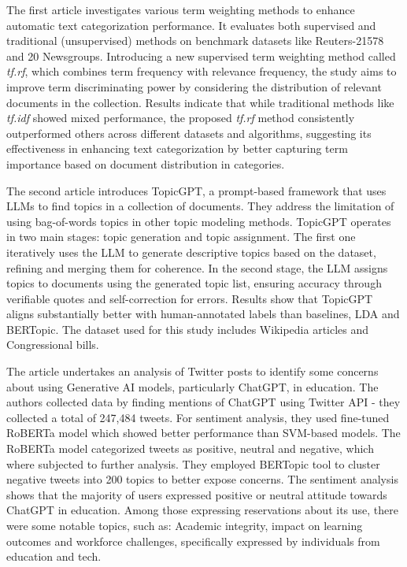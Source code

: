 \documentclass[fleqn,moreauthors,10pt]{ds_report}
\begin{document}
The first article \cite{4509437} investigates various term weighting methods to enhance automatic text categorization performance. It evaluates both supervised and traditional (unsupervised) methods on benchmark datasets like Reuters-21578 and 20 Newsgroups. Introducing a new supervised term weighting method called \textit{tf.rf}, which combines term frequency with relevance frequency, the study aims to improve term discriminating power by considering the distribution of relevant documents in the collection. Results indicate that while traditional methods like \textit{tf.idf} showed mixed performance, the proposed \textit{tf.rf} method consistently outperformed others across different datasets and algorithms, suggesting its effectiveness in enhancing text categorization by better capturing term importance based on document distribution in categories.



The second article \cite{pham2023topicgpt} introduces TopicGPT, a prompt-based framework that uses LLMs to find topics in a collection of documents. They address the limitation of using bag-of-words topics in other topic modeling methods. TopicGPT operates in two main stages: topic generation and topic assignment. The first one iteratively uses the LLM to generate descriptive topics based on the dataset, refining and merging them for coherence. In the second stage, the LLM assigns topics to documents using the generated topic list, ensuring accuracy through verifiable quotes and self-correction for errors. Results show that TopicGPT aligns substantially better with human-annotated labels than baselines, LDA and BERTopic. The dataset used for this study includes Wikipedia articles and Congressional bills.

The article \cite{Li_Ma_Fan_Lee_Yu_Hemphill_2023} undertakes an analysis of Twitter posts to identify some concerns about using Generative AI models, particularly  ChatGPT, in education. The authors collected data by finding mentions of ChatGPT using Twitter API - they collected a total of 247,484 tweets. For sentiment analysis, they used fine-tuned RoBERTa model which showed better performance than SVM-based models. The RoBERTa model categorized tweets as positive, neutral and negative, which where subjected to further analysis. They employed BERTopic tool to cluster negative tweets into 200 topics to better expose concerns. The sentiment analysis shows that the majority of users expressed positive or neutral attitude towards ChatGPT in education. Among those expressing reservations about its use, there were some notable topics, such as: Academic integrity, impact on learning outcomes and workforce challenges, specifically expressed by individuals from education and tech. 
\end{document}
